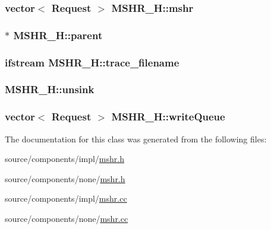 \hypertarget{classMSHR__H_a46028543e0902980f6732c2ec1460e1}{
\subsubsection[{mshr}]{\setlength{\rightskip}{0pt plus 5cm}vector$<$ {\bf Request} $>$ {\bf MSHR\_\-H::mshr}}}
\label{classMSHR__H_a46028543e0902980f6732c2ec1460e1}


\hypertarget{classMSHR__H_db1067e0a44f5878fe6c1b7c437f9d93}{
\subsubsection[{parent}]{ $\ast$ {\bf MSHR\_\-H::parent}}}
\label{classMSHR__H_db1067e0a44f5878fe6c1b7c437f9d93}


\hypertarget{classMSHR__H_6e19d2203f1ad9bf624596e00d600516}{
\subsubsection[{trace\_\-filename}]{\setlength{\rightskip}{0pt plus 5cm}ifstream {\bf MSHR\_\-H::trace\_\-filename}}}
\label{classMSHR__H_6e19d2203f1ad9bf624596e00d600516}


\hypertarget{classMSHR__H_9e26b7281b5d4ec954954209aae9ebfa}{
\subsubsection[{unsink}]{ {\bf MSHR\_\-H::unsink}}}
\label{classMSHR__H_9e26b7281b5d4ec954954209aae9ebfa}


\hypertarget{classMSHR__H_4b93a7397177a907d0ee3a3cebcbbbda}{
\subsubsection[{writeQueue}]{\setlength{\rightskip}{0pt plus 5cm}vector$<$ {\bf Request} $>$ {\bf MSHR\_\-H::writeQueue}}}
\label{classMSHR__H_4b93a7397177a907d0ee3a3cebcbbbda}




The documentation for this class was generated from the following files:\begin{CompactItemize}
\item 
source/components/impl/\hyperlink{impl_2mshr_8h}{mshr.h}\item 
source/components/none/\hyperlink{none_2mshr_8h}{mshr.h}\item 
source/components/impl/\hyperlink{impl_2mshr_8cc}{mshr.cc}\item 
source/components/none/\hyperlink{none_2mshr_8cc}{mshr.cc}\end{CompactItemize}
